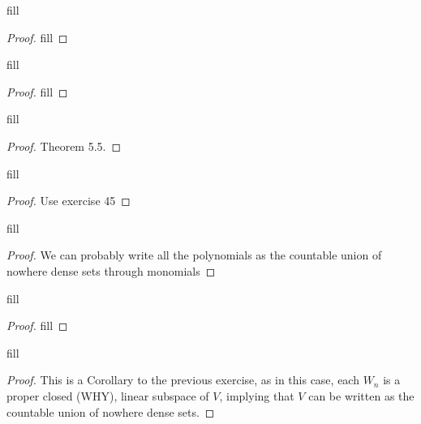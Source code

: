 \begin{exercise}{40}
fill
\end{exercise}
\begin{proof}
fill
\end{proof} 

\begin{exercise}{42}
fill
\end{exercise}
\begin{proof}
fill
\end{proof} 

\begin{exercise}{43}
fill
\end{exercise}
\begin{proof}
Theorem 5.5.
\end{proof} 

\begin{exercise}{46}
fill
\end{exercise}
\begin{proof}
Use exercise 45
\end{proof} 

\begin{exercise}{47}
fill
\end{exercise}
\begin{proof}
We can probably write all the polynomials as the countable union of nowhere dense sets through monomials
\end{proof} 

\begin{exercise}{48}
fill
\end{exercise}
\begin{proof}
fill
\end{proof} 

\begin{exercise}{49}
fill
\end{exercise}
\begin{proof}
This is a Corollary to the previous exercise, as in this case, each $W_n$ is a proper closed (WHY), linear subspace of $V$, implying that $V$ can be written as the countable union of nowhere dense sets.
\end{proof} 